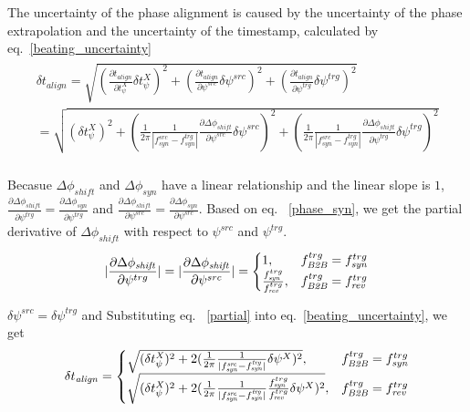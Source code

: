 \begin{itemize}
The uncertainty of the phase alignment is caused by the uncertainty of the phase extrapolation and the uncertainty of the timestamp, calculated by eq.~\ref{beating_uncertainty}
\begin{eqnarray}
\begin{aligned}
\delta t_\mathit{align} =\sqrt {(\frac {\partial t_\mathit{align}}{\partial t_\psi^\mathit{X}} \delta t_\psi^\mathit{X})^2 +(\frac {\partial t_\mathit{align}}{\partial \psi^{src}} \delta\psi^{src})^2+(\frac {\partial t_\mathit{align}}{\partial \psi^{trg}} \delta\psi^{trg})^2  }\\
=\sqrt {(\delta t_\psi^\mathit{X})^2 +(\frac{1}{2\pi}\frac{1}{|f_{\mathit{syn}}^\mathit{src}-f_{\mathit{syn}}^\mathit{trg}|}\frac {\partial \Delta \phi_\mathit{shift}}{\partial \psi^{src}}  \delta  \psi^{src})^2 +(\frac{1}{2\pi}\frac{1}{|f_{\mathit{syn}}^\mathit{src}-f_{\mathit{syn}}^\mathit{trg}|}\frac {\partial \Delta \phi_\mathit{shift}}{\partial \psi^{trg}}  \delta  \psi^{trg})^2}\\
\label{beating_uncertainty}
\end{aligned}
\end{eqnarray}

Becasue $\Delta \phi_\mathit{shift}$ and $\Delta \phi_\mathit{syn}$ have a linear relationship and the linear slope is $1$, $\frac {\partial \Delta \phi_\mathit{shift}}{\partial \psi^{trg}}=\frac {\partial \Delta \phi_\mathit{syn}}{\partial \psi^{trg}}$ and $\frac {\partial \Delta \phi_\mathit{shift}}{\partial \psi^{src}}=\frac {\partial \Delta \phi_\mathit{syn}}{\partial \psi^{src}}$. Based on eq. ~\ref{phase_syn}, we get the partial derivative of $\Delta \phi_\mathit{shift}$ with respect to $\psi^{src}$ and $\psi^{trg}$.
\begin{eqnarray}\label{partial}
|\frac {\partial \Delta \phi_\mathit{shift}}{\partial \psi^{trg}}| = |\frac {\partial \Delta \phi_\mathit{shift}}{\partial \psi^{src}}|=
\begin{cases}
1, &f_{\mathit{B2B}}^{trg}=f_{\mathit{syn}}^{trg}\cr
\frac{f_{\mathit{syn}}^{trg}}{f_{\mathit{rev}}^{trg}}, &f_{\mathit{B2B}}^{trg}=f_{\mathit{rev}}^{trg}\cr
\end{cases}
\end{eqnarray}

$\delta  \psi^{src}=\delta  \psi^{trg}$ and Substituting eq. ~\ref{partial} into eq.~\ref{beating_uncertainty}, we get 
\begin{eqnarray}
\delta t_\mathit{align}=
\begin{cases}
\sqrt {(\delta t_\psi^\mathit{X})^2 +2(\frac{1}{2\pi}\frac{1}{|f_{\mathit{syn}}^\mathit{src}-f_{\mathit{syn}}^\mathit{trg}|} \delta  \psi^{X})^2 }, &f_{\mathit{B2B}}^{trg}=f_{\mathit{syn}}^{trg}\cr
\sqrt {(\delta t_\psi^\mathit{X})^2 +2(\frac{1}{2\pi}\frac{1}{|f_{\mathit{syn}}^\mathit{src}-f_{\mathit{syn}}^\mathit{trg}|} \frac{f_{\mathit{syn}}^{trg}}{f_{\mathit{rev}}^{trg}}\delta  \psi^{X})^2 }, &f_{\mathit{B2B}}^{trg}=f_{\mathit{rev}}^{trg}\cr
\end{cases}
\end{eqnarray}


\end{itemize}
